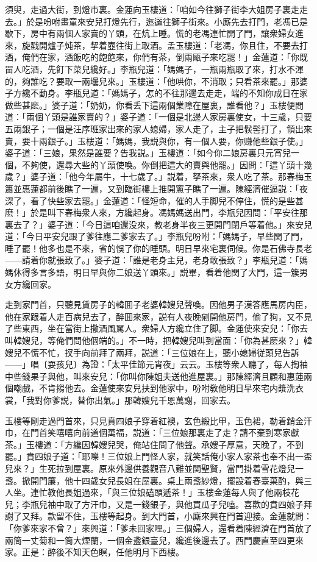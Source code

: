 須臾，走過大街，到燈市裏。金蓮向玉樓道：「咱如今往獅子街李大姐房子裏走走去。」於是吩咐畫童來安兒打燈先行，迤邐往獅子街來。小廝先去打門，老馮已是歇下，房中有兩個人家賣的丫頭，在炕上睡。慌的老馮連忙開了門，讓衆婦女進來，旋戳開爐子炖茶，挈着壺往街上取酒。孟玉樓道：「老馮，你且住，不要去打酒，俺們在家，酒飯吃的飽飽來，你們有茶，倒兩甌子來吃罷！」金蓮道：「你既㽞人吃酒，先飣下菜兒纔好。」李瓶兒道：「媽媽子，一瓶兩瓶取了來，打水不渾的，夠誰吃？要取一兩壜兒來。」玉樓道：「他哄你，不消取；只看茶來罷。」那婆子方纔不動身。李瓶兒道：「媽媽子，怎的不往那邊去走走，端的不知你成日在家做些甚麽。」婆子道：「奶奶，你看丢下這兩個業障在屋裏，誰看他？」玉樓便問道：「兩個丫頭是誰家賣的？」婆子道：「一個是北邊人家房裏使女，十三歲，只要五兩銀子；一個是汪序班家出來的家人媳婦，家人走了，主子把䯼髻打了，領出來賣，要十兩銀子。」玉樓道：「媽媽，我説與你，有一個人要，你赚他些銀子使。」婆子道：「三娘，果然是誰要？告我説。」玉樓道：「如今你二娘房裏只元宵兒一個，不夠使，還尋大些的丫頭使喚。你倒把這大的賣與他罷。」因問：「這丫頭十幾歲？」婆子道：「他今年屬牛，十七歲了。」説着，拏茶來，衆人吃了茶。那春梅玉簫並惠蓮都前後瞧了一遍，又到臨街樓上推開窻子瞧了一遍。陳經濟催逼説：「夜深了，看了快些家去罷。」金蓮道：「怪短命，催的人手脚兒不停住，慌的是些甚麽！」於是叫下春梅衆人來，方纔起身。馮媽媽送出門，李瓶兒因問：「平安往那裏去了？」婆子道：「今日這咱還没來，教老身半夜三更開門閉戶等着他。」來安兒道：「今日平安兒跟了爹往應二爹家去了。」李瓶兒吩咐：「媽媽子，早些関了門，睡了罷！他多也是不來，省的悞了你的睡頭。明日早來宅裏伺候。你是石佛寺長老——請着你就張致了。」婆子道：「誰是老身主兒，老身敢張致？」李瓶兒道：「媽媽休得多言多語，明日早與你二娘送丫頭來。」説畢，看着他関了大門，這一簇男女方纔回家。

走到家門首，只聽見賃房子的韓囬子老婆韓嫂兒聲喚。因他男子漢答應馬房内臣，他在家跟着人走百病兒去了，醉囬來家，説有人夜晚剜開他房門，偷了狗，又不見了些東西，坐在當街上撒酒風駡人。衆婦人方纔立住了脚。金蓮使來安兒：「你去叫韓嫂兒，等俺們問他個端的。」不一時，把韓嫂兒叫到當面：「你為甚麽來？」韓嫂兒不慌不忙，扠手向前拜了兩拜，説道：「三位娘在上，聽小媳婦従頭兒告訴——」唱〔耍孩兒〕為證：「太平佳節元宵夜」云云。玉樓等衆人聽了，每人掏袖中些錢果子與他，叫來安兒：「你叫你陳姐夫送他進屋裏。」那陳經濟且顧和惠蓮兩個嘲戲，不肯搊他去。金蓮使來安兒扶到他家中，吩咐敎他明日早來宅内漿洗衣裳，「我對你爹説，替你出氣。」那韓嫂兒千恩萬謝，回家去。

玉樓等剛走過門首來，只見賁四娘子穿着紅襖，玄色緞比甲，玉色裙，勒着銷金汗巾，在門首笑嘻嘻向前道個萬福，説道：「三位娘那裏走了走？請不棄到寒家獻茶。」玉樓道：「方纔因韓嫂兒哭，俺站住問了他聲。承嫂子厚意，天晚了，不到罷。」賁四娘子道：「耶嚛！三位娘上門怪人家，就笑話俺小家人家茶也奉不出一盃兒來？」生死拉到屋裏。原來外邊供養觀音八難並関聖賢，當門掛着雪花燈兒一盞。掀開門簾，他十四歲女兒長姐在屋裏。桌上兩盞紗燈，擺設着春臺菓酌，與三人坐。連忙教他長姐過來，「與三位娘磕頭遞茶！」玉樓金蓮每人與了他兩枝花兒；李瓶兒袖中取了方汗巾，又是一錢銀子，與他買瓜子兒嗑。喜歡的賁四娘子拜謝了又拜。款留不住，玉樓等起身。到大門首，小廝來興在門首迎接。金蓮就問：「你爹來家不曾？」來興道：「爹未回家哩。」三個婦人，還看着陳經濟在門首放了兩筒一丈菊和一筒大煙蘭，一個金盞銀臺兒，纔進後邊去了。西門慶直至四更來家。正是：醉後不知天色瞑，任他明月下西樓。

